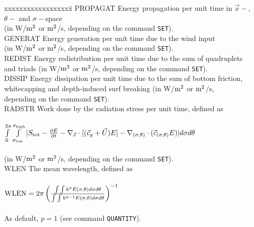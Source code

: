 \documentclass[12pt]{book}
\begin{document}
\begin{tabbing}
xxxxxxxxxxxxxxxxxx\= \kill
PROPAGAT             \> Energy propagation per unit time in $\vec{x}-$, $\theta-$ and $\sigma-$space\+\\
                        (in W/${\rm m}^2$ or ${\rm m}^2$/s, depending on the command {\tt SET}).\-\\
GENERAT              \> Energy generation per unit time due to the wind input\+\\
                        (in W/${\rm m}^2$ or ${\rm m}^2$/s, depending on the command {\tt SET}).\-\\
REDIST               \> Energy redistribution per unit time due to the sum of quadruplets\+\\
                        and triads (in W/${\rm m}^2$ or ${\rm m}^2$/s, depending on the command {\tt SET}).\-\\
DISSIP               \> Energy dissipation per unit time due to the sum of bottom friction,\+\\
                        whitecapping and depth-induced
                        surf breaking (in W/${\rm m}^2$ or ${\rm m}^2$/s,\\
                        depending on the command {\tt SET}).\-\\
RADSTR               \> Work done by the radiation stress per unit time, defined as\+\\
                        \\
$\int\limits_{0}\limits^{2\pi} \int\limits_{\sigma_{\mbox{\tiny low}}}\limits^{\sigma_{\mbox{\tiny high}}} |S_{\rm tot} - \frac{\partial E}{\partial t} - \nabla_{\vec{x}} \cdot [({\vec{c}}_g + \vec{U}) E] - \nabla_{(\sigma,\theta)} \cdot ({\vec{c}}_{(\sigma,\theta)} E)| d\sigma d\theta$ \\
                        \\
                        (in W/${\rm m}^2$ or ${\rm m}^2$/s, depending on the command {\tt SET}).\-\\
WLEN                 \> The mean wavelength, defined as\+\\
                        \\
${\rm WLEN} = 2\pi \left( \frac{\int \int k^{p} E(\sigma,\theta)d\sigma d\theta}{\int \int k^{p-1} E(\sigma,\theta)d\sigma d\theta} \right)^{-1}$ \\
                        \\
                        As default, $p=1$ (see command {\tt QUANTITY}).\-\\

\end{tabbing}
\end{document}
